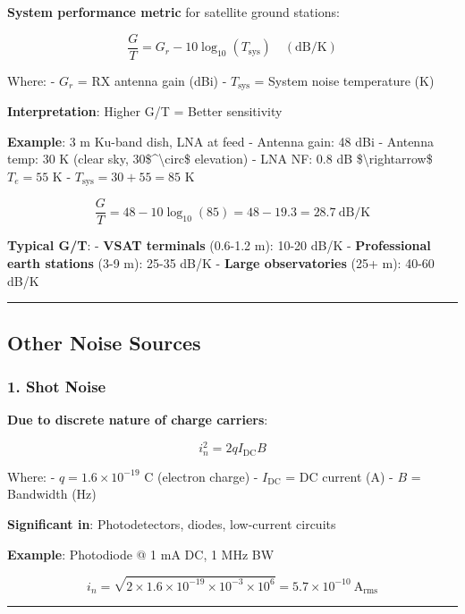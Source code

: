 \textbf{System performance metric} for satellite ground stations:

\[
\frac{G}{T} = G_r - 10\log_{10}(T_{\text{sys}}) \quad (\text{dB/K})
\]

Where: - \(G_r\) = RX antenna gain (dBi) - \(T_{\text{sys}}\) = System
noise temperature (K)

\textbf{Interpretation}: Higher G/T = Better sensitivity

\textbf{Example}: 3 m Ku-band dish, LNA at feed - Antenna gain: 48 dBi -
Antenna temp: 30 K (clear sky, 30\$\^{}\textbackslash circ\$ elevation)
- LNA NF: 0.8 dB \$\textbackslash rightarrow\$ \(T_e = 55\) K -
\(T_{\text{sys}} = 30 + 55 = 85\) K

\[
\frac{G}{T} = 48 - 10\log_{10}(85) = 48 - 19.3 = 28.7\ \text{dB/K}
\]

\textbf{Typical G/T}: - \textbf{VSAT terminals} (0.6-1.2 m): 10-20 dB/K
- \textbf{Professional earth stations} (3-9 m): 25-35 dB/K -
\textbf{Large observatories} (25+ m): 40-60 dB/K

\begin{center}\rule{0.5\linewidth}{0.5pt}\end{center}

\subsection{Other Noise Sources}\label{other-noise-sources}

\subsubsection{1. Shot Noise}\label{shot-noise}

\textbf{Due to discrete nature of charge carriers}:

\[
i_n^2 = 2 q I_{\text{DC}} B
\]

Where: - \(q = 1.6 \times 10^{-19}\) C (electron charge) -
\(I_{\text{DC}}\) = DC current (A) - \(B\) = Bandwidth (Hz)

\textbf{Significant in}: Photodetectors, diodes, low-current circuits

\textbf{Example}: Photodiode @ 1 mA DC, 1 MHz BW

\[
i_n = \sqrt{2 \times 1.6 \times 10^{-19} \times 10^{-3} \times 10^6} = 5.7 \times 10^{-10}\ \text{A}_{\text{rms}}
\]

\begin{center}\rule{0.5\linewidth}{0.5pt}\end{center}

